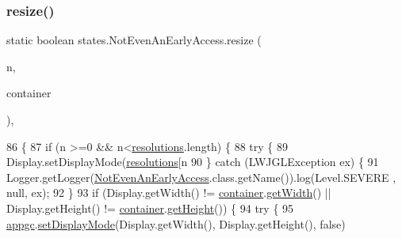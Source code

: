 \subsubsection{\texorpdfstring{resize()}{resize()}}
{\footnotesize\ttfamily static boolean states.\+Not\+Even\+An\+Early\+Access.\+resize (\begin{DoxyParamCaption}\item[{int}]{n,  }\item[{\mbox{\hyperlink{classorg_1_1newdawn_1_1slick_1_1_game_container}{Game\+Container}}}]{container }\end{DoxyParamCaption})\hspace{0.3cm}{\ttfamily [inline]}, {\ttfamily [static]}}


\begin{DoxyCode}
86                                                                  \{
87         \textcolor{keywordflow}{if} (n >=0 && n<\mbox{\hyperlink{classstates_1_1_not_even_an_early_access_a6ec8bd68962b143c4b5f371ee0b97fc5}{resolutions}}.length) \{
88             \textcolor{keywordflow}{try} \{
89                 Display.setDisplayMode(\mbox{\hyperlink{classstates_1_1_not_even_an_early_access_a6ec8bd68962b143c4b5f371ee0b97fc5}{resolutions}}[n %
90             \} \textcolor{keywordflow}{catch} (LWJGLException ex) \{
91                 Logger.getLogger(\mbox{\hyperlink{classstates_1_1_not_even_an_early_access_a841753f18ba88df25763818e6caa686f}{NotEvenAnEarlyAccess}}.class.getName()).log(Level.SEVERE
      , null, ex);
92             \}
93             \textcolor{keywordflow}{if} (Display.getWidth() != \mbox{\hyperlink{classorg_1_1newdawn_1_1slick_1_1state_1_1_state_based_game_a538846600436175cbed48450adfdd025}{container}}.\mbox{\hyperlink{classorg_1_1newdawn_1_1slick_1_1_game_container_a938fe1a28567182445e60450915d5f69}{getWidth}}() || Display.getHeight() != 
      \mbox{\hyperlink{classorg_1_1newdawn_1_1slick_1_1state_1_1_state_based_game_a538846600436175cbed48450adfdd025}{container}}.\mbox{\hyperlink{classorg_1_1newdawn_1_1slick_1_1_game_container_a7eff88473fe5715fdfc2f92e8cb48521}{getHeight}}()) \{
94                 \textcolor{keywordflow}{try} \{
95                     \mbox{\hyperlink{classstates_1_1_not_even_an_early_access_a6dbb502cb4c878abfd65a496df8fdda7}{appgc}}.\mbox{\hyperlink{classorg_1_1newdawn_1_1slick_1_1_app_game_container_aa2de68db61ddd3917a8edc0177ebdfe3}{setDisplayMode}}(Display.getWidth(), Display.getHeight(), \textcolor{keyword}{false})

\end{DoxyCode}

